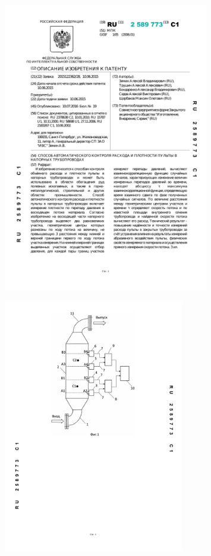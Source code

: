 \documentclass[russian, utf8, 12pt]{eskdtext}
\begin{document}
\ESKDappendix{}{}
\begin{figure} [h!]
	\centering
	\includegraphics[width = 0.8\textwidth]{patent1-1.pdf}
\end{figure}
\begin{figure} [h!]
	\centering
	\includegraphics[width = 0.7\textwidth]{patent1-2.pdf}
\end{figure}
\end{document}
